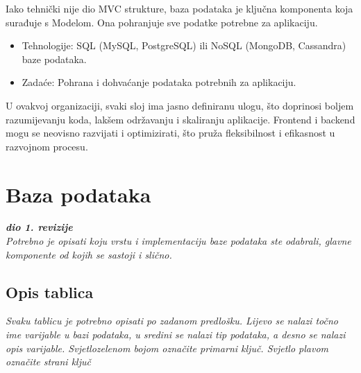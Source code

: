 Iako tehnički nije dio MVC strukture, baza podataka je ključna komponenta koja surađuje s Modelom. Ona pohranjuje sve podatke potrebne za aplikaciju.
\begin{itemize}
		  \item {Tehnologije: SQL (MySQL, PostgreSQL) ili NoSQL (MongoDB, Cassandra) baze podataka.}
		  \item {Zadaće: Pohrana i dohvaćanje podataka potrebnih za aplikaciju.}	
	   \end{itemize}

U ovakvoj organizaciji, svaki sloj ima jasno definiranu ulogu, što doprinosi boljem razumijevanju koda, lakšem održavanju i skaliranju aplikacije. Frontend i backend mogu se neovisno razvijati i optimizirati, što pruža fleksibilnost i efikasnost u razvojnom procesu.



				
		\section{Baza podataka}
			
			\textbf{\textit{dio 1. revizije}}\\
			
		\textit{Potrebno je opisati koju vrstu i implementaciju baze podataka ste odabrali, glavne komponente od kojih se sastoji i slično.}
		
			\subsection{Opis tablica}
			

				\textit{Svaku tablicu je potrebno opisati po zadanom predlošku. Lijevo se nalazi točno ime varijable u bazi podataka, u sredini se nalazi tip podataka, a desno se nalazi opis varijable. Svjetlozelenom bojom označite primarni ključ. Svjetlo plavom označite strani ključ}
				
